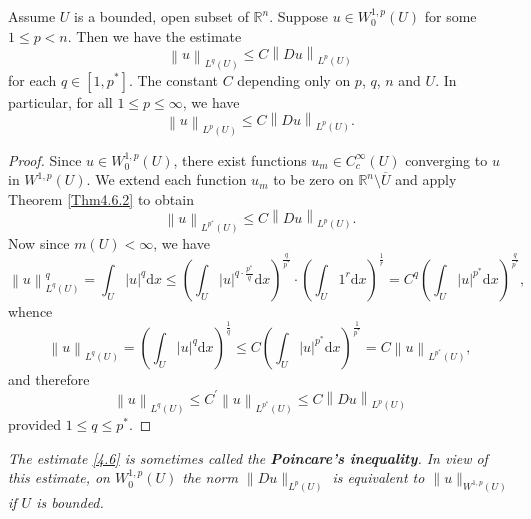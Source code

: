 \begin{theorem}
Assume $U$ is a bounded, open subset of $\mathbb{R}^n$. Suppose $u\in W_0^{1,p}(U)$ for some $1\le p<n$. Then we have the estimate 
\begin{equation}\label{4.6}
\left\| u \right\| _{L^q\left( U \right)}\le C\left\| Du \right\| _{L^p\left( U \right)}
\end{equation}
for each $q\in [1,p^*]$. The constant $C$ depending only on $p$, $q$, $n$ and $U$. In particular, for all $1\le p\le\infty$, we have 
$$
\left\| u \right\| _{L^p\left( U \right)}\le C\left\| Du \right\| _{L^p\left( U \right)}.
$$
\end{theorem}
\begin{proof}
Since $u\in W_0^{1,p}(U)$, there exist functions $u_m\in C_c^\infty(U)$ converging to $u$ in $W^{1,p}(U)$. We extend each function $u_m$ to be zero on $\mathbb{R}^n\setminus\overline{U}$ and apply Theorem \ref{Thm4.6.2} to obtain 
$$
\left\| u \right\| _{L^{p^*}\left( U \right)}\le C\left\| Du \right\| _{L^p\left( U \right)}.
$$
Now since $m(U)<\infty$, we have 
$$
\left\| u \right\| _{L^q\left( U \right)}^{q}=\int_U{\left| u \right|^q\mathrm{d}x}\le \left( \int_U{\left| u \right|^{q\cdot \frac{p^*}{q}}\mathrm{d}x} \right) ^{\frac{q}{p^*}}\cdot \left( \int_U{1^r\mathrm{d}x} \right) ^{\frac{1}{r}}=C^q\left( \int_U{\left| u \right|^{p^*}\mathrm{d}x} \right) ^{\frac{q}{p^*}},
$$
whence 
$$
\left\| u \right\| _{L^q\left( U \right)}=\left( \int_U{\left| u \right|^q\mathrm{d}x} \right) ^{\frac{1}{q}}\le C\left( \int_U{\left| u \right|^{p^*}\mathrm{d}x} \right) ^{\frac{1}{p^*}}=C\left\| u \right\| _{L^{p^*}\left( U \right)},
$$
and therefore 
$$
\left\| u \right\| _{L^q\left( U \right)}\le C^{\prime}\left\| u \right\| _{L^{p^*}\left( U \right)}\le C\left\| Du \right\| _{L^p\left( U \right)}
$$
provided $1\le q\le p^*$.
\end{proof}
\begin{note}\em
The estimate \eqref{4.6} is sometimes called the \textbf{Poincare's inequality}. In view of this estimate, on $W_0^{1,p}(U)$ the norm $\|Du\|_{L^p(U)}$ is equivalent to $\|u\|_{W^{1,p}(U)}$ if $U$ is bounded.
\end{note}